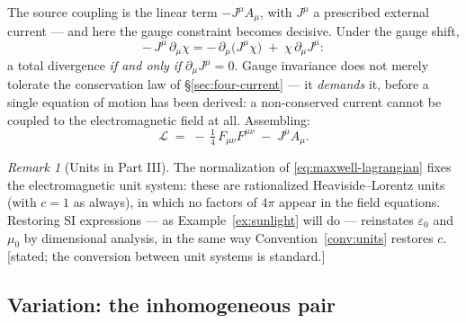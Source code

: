 \documentclass[11pt]{article}
\theoremstyle{plain}
\theoremstyle{definition}
\theoremstyle{remark}
\newtheorem{remark}[theorem]{Remark}
\begin{document}
The source coupling is the linear term $-J^\mu A_\mu$, with $J^\mu$
a prescribed external current --- and here the gauge constraint
becomes decisive. Under the gauge shift,
\begin{equation}
  -\,J^\mu\,\partial_\mu\chi
  = -\,\partial_\mu\bigl(J^\mu \chi\bigr)
  \;+\; \chi\,\partial_\mu J^\mu :
  \label{eq:gauge-forces-conservation}
\end{equation}
a total divergence \emph{if and only if} $\partial_\mu J^\mu = 0$.
Gauge invariance does not merely tolerate the conservation law of
\S\ref{sec:four-current} --- it \emph{demands} it, before a single
equation of motion has been derived: a non-conserved current cannot
be coupled to the electromagnetic field at all. Assembling:
\begin{equation}
  \boxed{\;
  \mathcal L
  \;=\;
  -\,\tfrac14\, F_{\mu\nu}F^{\mu\nu}
  \;-\; J^\mu A_\mu .
  \;}
  \label{eq:maxwell-lagrangian}
\end{equation}

\begin{remark}[Units in Part III]\label{rem:units-EM}
The normalization of \eqref{eq:maxwell-lagrangian} fixes the
electromagnetic unit system: these are rationalized
Heaviside--Lorentz units (with $c = 1$ as always), in which no factors
of $4\pi$ appear in the field equations. Restoring SI expressions ---
as Example~\ref{ex:sunlight} will do --- reinstates $\varepsilon_0$
and $\mu_0$ by dimensional analysis, in the same way
Convention~\ref{conv:units} restores $c$. [stated; the conversion
between unit systems is standard.]
\end{remark}

\subsection{Variation: the inhomogeneous pair}
\label{sec:inhomogeneous}
\end{document}
